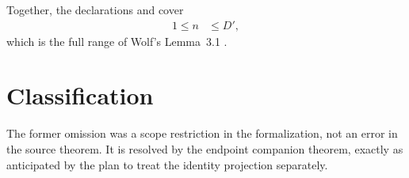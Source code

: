 \documentclass{article}
\begin{document}
Together, the declarations
 and
 cover
\begin{align}
    1\leq n
        &\leq D',
    \label{eq:wolf_lemma_3_1_top_index_scope_resolved_full_range}
\end{align}
which is the full range of Wolf's Lemma~3.1
\cite[Lemma~3.1]{Wolf2012Quantum}.

\section{Classification}

The former omission was a scope restriction in the formalization, not an
error in the source theorem. It is resolved by the endpoint companion theorem,
exactly as anticipated by the plan to treat the identity projection
separately.



\end{document}
